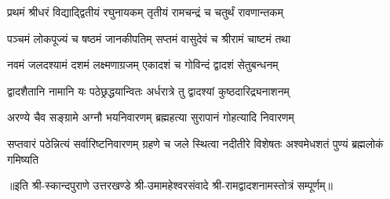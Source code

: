 

\twolineshloka
{प्रथमं श्रीधरं विद्याद्द्वितीयं रघुनायकम्}
{तृतीयं रामचन्द्रं च चतुर्थं रावणान्तकम्}

\twolineshloka
{पञ्चमं लोकपूज्यं च षष्ठमं जानकीपतिम्}
{सप्तमं वासुदेवं च श्रीरामं चाष्टमं तथा}

\twolineshloka
{नवमं जलदश्यामं दशमं लक्ष्मणाग्रजम्}
{एकादशं च गोविन्दं द्वादशं सेतुबन्धनम्}

\twolineshloka
{द्वादशैतानि नामानि यः पठेछ्रद्धयान्वितः}
{अर्धरात्रे तु द्वादश्यां कुष्ठदारिद्र्यनाशनम्}

\twolineshloka
{अरण्ये चैव सङ्ग्रामे अग्नौ भयनिवारणम्}
{ब्रह्महत्या सुरापानं गोहत्यादि निवारणम्}

\threelineshloka
{सप्तवारं पठेन्नित्यं सर्वारिष्टनिवारणम्}
{ग्रहणे च जले स्थित्वा नदीतीरे विशेषतः}
{अश्वमेधशतं पुण्यं ब्रह्मलोकं गमिष्यति}

॥इति श्री-स्कान्दपुराणे उत्तरखण्डे श्री-उमामहेश्वरसंवादे श्री-रामद्वादशनामस्तोत्रं सम्पूर्णम्॥